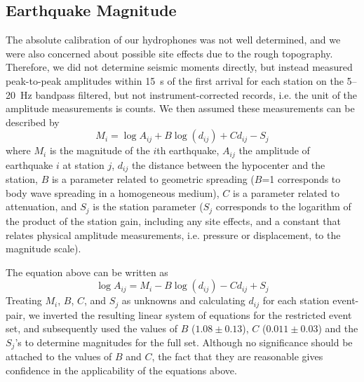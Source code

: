 \documentclass[jgr]{agu2001}
\newlength{\tw}
\begin{document}
\begin{article}
\section{Earthquake Magnitude}

The absolute calibration of our hydrophones was not well determined,
and we were also concerned about possible site effects due to
the rough topography.  Therefore, we did not determine seismic moments
directly, but instead measured peak-to-peak amplitudes within 15~s of
the first arrival for each station on the 5--20~Hz bandpass filtered,
but not instrument-corrected
records, i.e. the unit of the amplitude measurements is counts.
  We then assumed these measurements
can be described by \citep[modified from][]{hutton87}
\begin{equation}
M_i=\log A_{ij} + B \log(d_{ij}) + C d_{ij} - S_{j}
\end{equation}
where $M_i$ is the magnitude of the $i$th earthquake, $A_{ij}$ the
amplitude of earthquake $i$ at station $j$, $d_{ij}$ the distance
between the hypocenter and the station, $B$ is a parameter related to
geometric spreading ($B$=1 corresponds to body wave spreading in a
homogeneous medium), $C$ is a parameter related to attenuation, and
$S_{j}$ is the station parameter ($S_{j}$ corresponds to the logarithm
of the product of the station gain, including any site effects, and a
constant that relates physical amplitude measurements, i.e. pressure
or displacement, to the magnitude scale).

The equation above can be written as 
\begin{equation}
\log A_{ij}= M_i - B \log(d_{ij}) - C d_{ij} + S_{j}
\end{equation}
Treating $M_i$, $B$, $C$, and $S_j$ as unknowns and calculating
$d_{ij}$ for each station event-pair, we inverted the resulting linear
system of equations for the restricted event set, and subsequently
used the values of $B$ ($1.08 \pm 0.13$), $C$ ($0.011\pm0.03$) and the
$S_{j}$'s to determine magnitudes for the full set.   
Although no significance should be attached to the values of $B$ and
$C$, the fact that they are reasonable gives confidence in the
applicability of the equations above.


\end{article}
\end{document}
